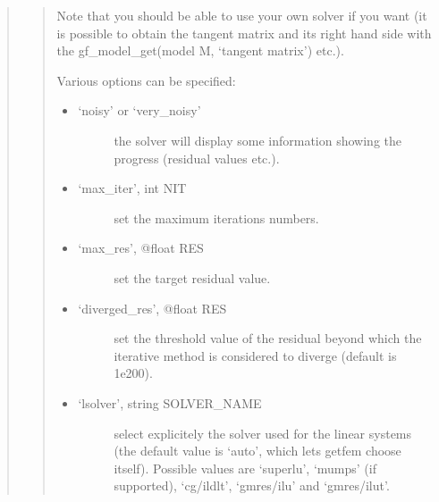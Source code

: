 \documentclass[a4paper,11pt,english]{sphinxmanual}
\begin{document}
\begin{quote}
\begin{quote}
\sphinxAtStartPar
Note that you should be able to use your own solver if you want
(it is possible to obtain the tangent matrix and its right hand
side with the gf\_model\_get(model M, ‘tangent matrix’) etc.).

\sphinxAtStartPar
Various options can be specified:
\begin{itemize}
\item {} \begin{description}
\item[{‘noisy’ or ‘very\_noisy’}] \leavevmode
\sphinxAtStartPar
the solver will display some information showing the progress
(residual values etc.).

\end{description}

\item {} \begin{description}
\item[{‘max\_iter’, int NIT}] \leavevmode
\sphinxAtStartPar
set the maximum iterations numbers.

\end{description}

\item {} \begin{description}
\item[{‘max\_res’, @float RES}] \leavevmode
\sphinxAtStartPar
set the target residual value.

\end{description}

\item {} \begin{description}
\item[{‘diverged\_res’, @float RES}] \leavevmode
\sphinxAtStartPar
set the threshold value of the residual beyond which the iterative
method is considered to diverge (default is 1e200).

\end{description}

\item {} \begin{description}
\item[{‘lsolver’, string SOLVER\_NAME}] \leavevmode
\sphinxAtStartPar
select explicitely the solver used for the linear systems (the
default value is ‘auto’, which lets getfem choose itself).
Possible values are ‘superlu’, ‘mumps’ (if supported),
‘cg/ildlt’, ‘gmres/ilu’ and ‘gmres/ilut’.

\end{description}


\end{itemize}
\end{quote}
\end{quote}
\end{document}
